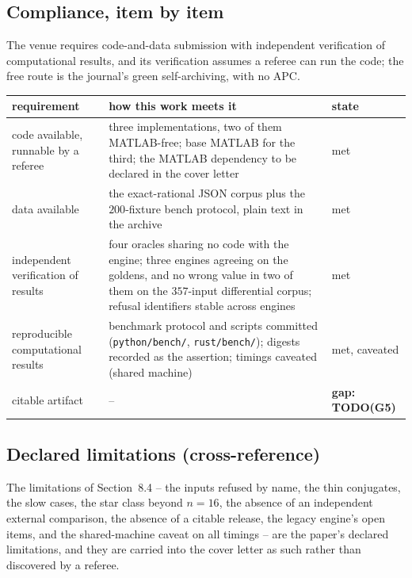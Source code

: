 \documentclass[11pt]{article}
\theoremstyle{definition}
\begin{document}
\subsection{Compliance, item by item}

The venue requires code-and-data submission with independent verification of
computational results, and its verification assumes a referee can run the code;
the free route is the journal's green self-archiving, with no APC.

\begin{center}
\begin{tabular}{p{4.9cm}p{7.0cm}p{2.5cm}}
\toprule
requirement & how this work meets it & state \\
\midrule
code available, runnable by a referee & three implementations, two of them
MATLAB-free; base MATLAB for the third; the MATLAB dependency to be declared
in the cover letter & met \\
data available & the exact-rational JSON corpus plus the $200$-fixture bench
protocol, plain text in the archive & met \\
independent verification of results & four oracles sharing no code with the
engine; three engines agreeing on the goldens, and no wrong value in two of them on the $357$-input differential corpus; refusal identifiers stable across
engines & met \\
reproducible computational results & benchmark protocol and scripts committed
(\texttt{python/bench/}, \texttt{rust/bench/}); digests recorded as the
assertion; timings caveated (shared machine) & met, caveated \\
citable artifact & -- & \textbf{gap: TODO(G5)}
\\
\bottomrule
\end{tabular}
\end{center}

\subsection{Declared limitations (cross-reference)}

The limitations of Section~8.4 -- the inputs refused by name, the thin conjugates, the slow
cases, the star class beyond $n=16$, the absence of an independent external comparison,
the absence of a citable release, the legacy engine's open items, and the
shared-machine caveat on all timings -- are the paper's declared limitations,
and they are carried into the cover letter as such rather than discovered by a
referee.
\end{document}
